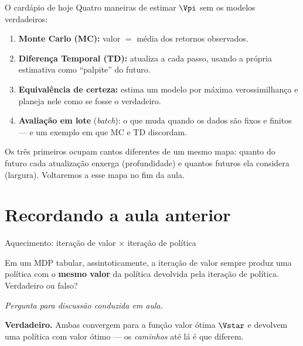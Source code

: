 \documentclass[aspectratio=169, 11pt]{beamer}
\newcommand{\paradiscussao}{\vspace{-0.2em}
  {\footnotesize\color{rlCinza}\itshape Pergunta para discussão conduzida em aula.}}
\begin{document}
\begin{frame}{O cardápio de hoje}
  Quatro maneiras de estimar $\Vpi$ sem os modelos verdadeiros:
  \begin{enumerate}
    \item \textbf{Monte Carlo (MC):} valor $=$ média dos retornos observados.
    \item \textbf{Diferença Temporal (TD):} atualiza a cada passo,
      usando a própria estimativa como ``palpite'' do futuro.
    \item \textbf{Equivalência de certeza:} estima um modelo por máxima
      verossimilhança e planeja nele como se fosse o verdadeiro.
    \item \textbf{Avaliação em lote} (\emph{batch}): o que muda quando os
      dados são fixos e finitos — e um exemplo em que MC e TD discordam.
  \end{enumerate}

  \begin{ideiabox}
    Os três primeiros ocupam cantos diferentes de um mesmo mapa:
    quanto do futuro cada atualização enxerga (profundidade) e
    quantos futuros ela considera (largura). Voltaremos a esse mapa
    no fim da aula.
  \end{ideiabox}
\end{frame}

\section{Recordando a aula anterior}

\begin{frame}{Aquecimento: iteração de valor $\times$ iteração de política}
  \begin{quizbox}{}
    Em um MDP tabular, assintoticamente, a iteração de valor sempre produz
    uma política com o \textbf{mesmo valor} da política devolvida pela
    iteração de política. Verdadeiro ou falso?
  \end{quizbox}
  \paradiscussao

  \pause
  \begin{respbox}
    \textbf{Verdadeiro.} Ambas convergem para a função valor ótima $\Vstar$
    e devolvem uma política com valor ótimo — os \emph{caminhos} até lá é
    que diferem.
  \end{respbox}
\end{frame}
\end{document}
